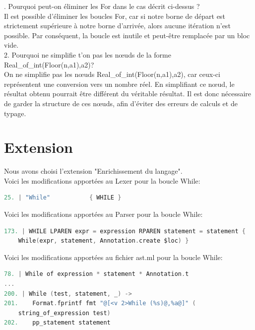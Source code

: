 \documentclass{report}
\begin{document}
    . Pourquoi peut-on éliminer les For dans le cas décrit ci-dessus ? \\

    Il est possible d'éliminer les boucles For, car si notre borne de départ est strictement supérieure à notre borne d'arrivée, alors aucune itération n'est possible. Par conséquent, la boucle est inutile et peut-être remplacée par un bloc vide. \\

    2. Pourquoi ne simplifie t'on pas les nœuds de la forme Real\_of\_int(Floor(n,a1),a2)? \\

    On ne simplifie pas les nœuds Real\_of\_int(Floor(n,a1),a2), car ceux-ci représentent une conversion vers un nombre réel. En simplifiant ce nœud, le résultat obtenu pourrait être différent du véritable résultat. Il est donc nécessaire de garder la structure de ces nœuds, afin d'éviter des erreurs de calculs et de typage.\\

    \section{Extension}

    Nous avons choisi l'extension "Enrichissement du langage".\\

    Voici les modifications apportées au Lexer pour la boucle While: \\

    \begin{lstlisting}[language=C, basicstyle=\ttfamily]
25. | "While"           { WHILE }
    \end{lstlisting}

    Voici les modifications apportées au Parser pour la boucle While: \\

    \begin{lstlisting}[language=C, basicstyle=\ttfamily]
173. | WHILE LPAREN expr = expression RPAREN statement = statement {
    While(expr, statement, Annotation.create $loc) }
    \end{lstlisting}

    Voici les modifications apportées au fichier ast.ml pour la boucle While: \\

    \begin{lstlisting}[language=C, basicstyle=\ttfamily]
78. | While of expression * statement * Annotation.t
...
200. | While (test, statement, _) ->
201.    Format.fprintf fmt "@[<v 2>While (%s)@,%a@]" (
    string_of_expression test)
202.    pp_statement statement
    \end{lstlisting}
\end{document}
